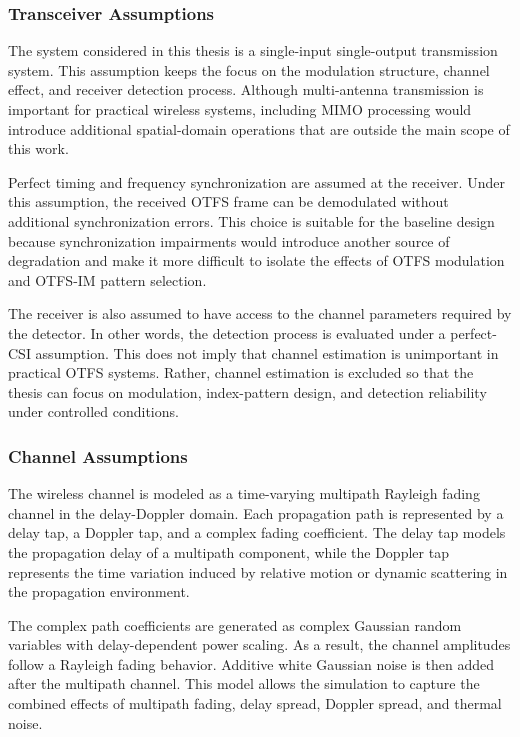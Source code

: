 \subsubsection{Transceiver Assumptions}

The system considered in this thesis is a single-input single-output transmission system. This assumption keeps the focus on the modulation structure, channel effect, and receiver detection process. Although multi-antenna transmission is important for practical wireless systems, including MIMO processing would introduce additional spatial-domain operations that are outside the main scope of this work.

Perfect timing and frequency synchronization are assumed at the receiver. Under this assumption, the received OTFS frame can be demodulated without additional synchronization errors. This choice is suitable for the baseline design because synchronization impairments would introduce another source of degradation and make it more difficult to isolate the effects of OTFS modulation and OTFS-IM pattern selection.

The receiver is also assumed to have access to the channel parameters required by the detector. In other words, the detection process is evaluated under a perfect-CSI assumption. This does not imply that channel estimation is unimportant in practical OTFS systems. Rather, channel estimation is excluded so that the thesis can focus on modulation, index-pattern design, and detection reliability under controlled conditions.

\subsubsection{Channel Assumptions}

The wireless channel is modeled as a time-varying multipath Rayleigh fading channel in the delay-Doppler domain. Each propagation path is represented by a delay tap, a Doppler tap, and a complex fading coefficient. The delay tap models the propagation delay of a multipath component, while the Doppler tap represents the time variation induced by relative motion or dynamic scattering in the propagation environment.

The complex path coefficients are generated as complex Gaussian random variables with delay-dependent power scaling. As a result, the channel amplitudes follow a Rayleigh fading behavior. Additive white Gaussian noise is then added after the multipath channel. This model allows the simulation to capture the combined effects of multipath fading, delay spread, Doppler spread, and thermal noise.

